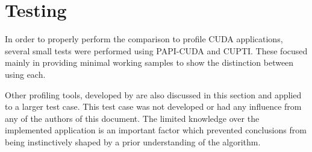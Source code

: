 \section{Testing}
\label{sec:test}


In order to properly perform the comparison to profile CUDA applications, several small tests were performed using PAPI-CUDA and CUPTI. These focused mainly in providing minimal working samples to show the distinction between using each.

Other profiling tools, developed by \nvidia are also discussed in this section and applied to a larger test case. This test case was not developed or had any influence from any of the authors of this document. The limited knowledge over the implemented application is an important factor which prevented conclusions from being instinctively shaped by a prior understanding of the algorithm.



